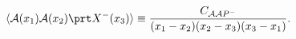 \begin{equation}
\langle {\cal A}(x_1){\cal A}(x_2)\prt X^-(x_3)\rangle
\equiv \frac{C_{{\cal A}{\cal A}P^-}}{(x_1-x_2)(x_2-x_3)(x_3-x_1)}.
\end{equation}

